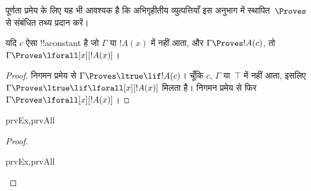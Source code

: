 \documentclass[../../../include/open-logic-section]{subfiles}
\begin{document}


\begin{explain}
  पूर्णता प्रमेय के लिए यह भी आवश्यक है कि अभिगृहीतीय व्युत्पत्तियाँ इस
  अनुभाग में स्थापित~$\Proves$ से संबंधित तथ्य प्रदान करें।
\end{explain}

\begin{thm}
 यदि $c$ ऐसा !!a{constant} है जो
$\Gamma$ या $!A(x)$ में नहीं आता, और $\Gamma \Proves !A(c)$, तो $\Gamma
\Proves \lforall[x][!A(x)]$।
\end{thm}

\begin{proof}
निगमन प्रमेय से $\Gamma \Proves \ltrue \lif !A(c)$। चूँकि $c$, $\Gamma$
या~$\top$ में नहीं आता, इसलिए $\Gamma \Proves
\ltrue \lif \lforall[x][!A(x)]$ मिलता है। निगमन प्रमेय से फिर $\Gamma \Proves
\lforall[x][!A(x)]$।
\end{proof}

\begin{prop}
\begin{tagenumerate}{prvEx,prvAll}

\end{tagenumerate}
\end{prop}

\begin{proof}
\begin{tagenumerate}{prvEx,prvAll}
\end{tagenumerate}
\end{proof}
\end{document}
